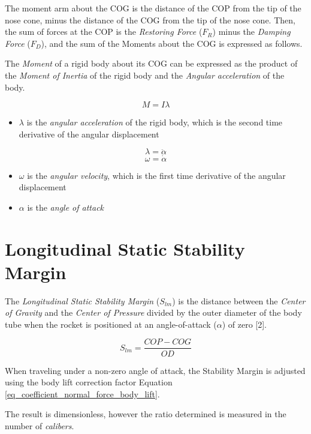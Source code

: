 \documentclass[]{book}
\providecommand{\tightlist}{%
  \setlength{\itemsep}{0pt}\setlength{\parskip}{0pt}}
\begin{document}
The moment arm about the COG is the distance of the COP from the tip of
the nose cone, minus the distance of the COG from the tip of the nose
cone. Then, the sum of forces at the COP is the \emph{Restoring Force}
(\(F_R\)) minus the \emph{Damping Force} (\(F_D\)), and the sum of the
Moments about the COG is expressed as follows.

The \emph{Moment} of a rigid body about its COG can be expressed as the
product of the \emph{Moment of Inertia} of the rigid body and the
\emph{Angular acceleration} of the body.

\begin{equation}
\label{eq_moment}
M = I \lambda 
\end{equation}

\begin{itemize}
\tightlist
\item
  \(\lambda\) is the \emph{angular acceleration} of the rigid body,
  which is the second time derivative of the angular displacement
\end{itemize}

\[ 
\lambda = \ddot{\alpha}
\] \[
\omega = \dot{\alpha}
\]

\begin{itemize}
\tightlist
\item
  \(\omega\) is the \emph{angular velocity}, which is the first time
  derivative of the angular displacement
\item
  \(\alpha\) is the \emph{angle of attack}
\end{itemize}

\section{Longitudinal Static Stability
Margin}\label{longitudinal-static-stability-margin}

The \emph{Longitudinal Static Stability Margin} (\(S_{lm}\)) is the
distance between the \emph{Center of Gravity} and the \emph{Center of
Pressure} divided by the outer diameter of the body tube when the rocket
is positioned at an angle-of-attack (\(\alpha\)) of zero {[}2{]}.

\[ S_{lm} = \dfrac{COP - COG}{OD} \]

When traveling under a non-zero angle of attack, the Stability Margin is
adjusted using the body lift correction factor Equation
\ref{eq_coefficient_normal_force_body_lift}.

The result is dimensionless, however the ratio determined is measured in
the number of \emph{calibers}.
\end{document}
